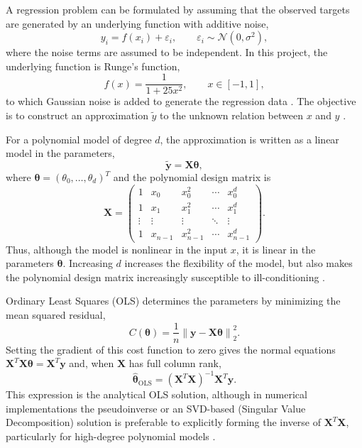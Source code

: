 \documentclass[aps,rmp,reprint,amsmath,amssymb,graphicx,longbibliography]{revtex4-1}
\begin{document}
A regression problem can be formulated by assuming that the observed targets
are generated by an underlying function with additive noise,
\begin{equation}
    y_i = f(x_i) + \varepsilon_i,
    \qquad
    \varepsilon_i \sim \mathcal{N}(0,\sigma^2),
    \label{eq:generated_data}
\end{equation}
where the noise terms are assumed to be independent. In this project, the
underlying function is Runge's function,
\begin{equation}
    f(x)=\frac{1}{1+25x^2}, \qquad x\in[-1,1],
\end{equation}
to which Gaussian noise is added to generate the regression data
\cite{UiOProject1_2026}. The objective is to construct an approximation
$\tilde{y}$ to the unknown relation between $x$ and $y$
\cite{HjorthJensen2026MLPS}.

For a polynomial model of degree $d$, the approximation is written as a linear
model in the parameters,
\begin{equation}
    \tilde{\mathbf{y}} = \mathbf{X}\boldsymbol{\theta},
\end{equation}
where $\boldsymbol{\theta}=(\theta_0,\ldots,\theta_d)^T$ and the polynomial
design matrix is
\begin{equation}
    \mathbf{X} =
    \begin{pmatrix}
        1 & x_0 & x_0^2 & \cdots & x_0^d \\
        1 & x_1 & x_1^2 & \cdots & x_1^d \\
        \vdots & \vdots & \vdots & \ddots & \vdots \\
        1 & x_{n-1} & x_{n-1}^2 & \cdots & x_{n-1}^d
    \end{pmatrix}.
\end{equation}
Thus, although the model is nonlinear in the input $x$, it is linear in the
parameters $\boldsymbol{\theta}$. Increasing $d$ increases the flexibility of
the model, but also makes the polynomial design matrix increasingly susceptible
to ill-conditioning \cite{HjorthJensen2026MLPS}.

Ordinary Least Squares (OLS) determines the parameters by minimizing the mean
squared residual,
\begin{equation}
    C(\boldsymbol{\theta})
    = \frac{1}{n}
      \left\lVert
      \mathbf{y}-\mathbf{X}\boldsymbol{\theta}
      \right\rVert_2^2.
      \label{eq:OLS_cost}
\end{equation}
Setting the gradient of this cost function to zero gives the normal equations
$\mathbf{X}^T\mathbf{X}\boldsymbol{\theta}
=\mathbf{X}^T\mathbf{y}$ and, when $\mathbf{X}$ has full column rank,
\begin{equation}
    \hat{\boldsymbol{\theta}}_{\mathrm{OLS}}
    =
    \left(\mathbf{X}^T\mathbf{X}\right)^{-1}
    \mathbf{X}^T\mathbf{y}.
    \label{eq:OLS_parameter}
\end{equation}
This expression is the analytical OLS solution, although in numerical
implementations the pseudoinverse or an SVD-based (Singular Value Decomposition) 
solution is preferable to explicitly forming the inverse of $\mathbf{X}^T\mathbf{X}$, 
particularly for high-degree polynomial models \cite{HjorthJensen2026MLPS}.
\end{document}
